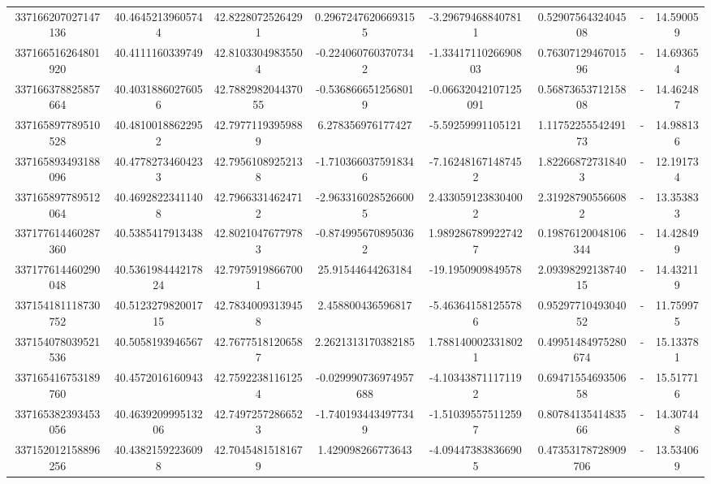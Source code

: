 \documentclass{article}
\begin{document}
\begin{landscape}
\begin{longtable}[c]{S[table-format=18.0]S[table-format=2.15]S[table-format=2.15]S[table-format=-2.17]S[table-format=-2.16]S[table-format=-2.16]S[table-format=-3.16]S[table-format=2.7]}
337166207027147136 & 40.46452139605744  & 42.82280725264291  & 0.29672476206693155   & -3.296794688407811   & 0.5290756432404508   & {-}                  & 14.590059  \\
337166516264801920 & 40.4111160339749   & 42.81033049835504  & -0.2240607603707342   & -1.3341711026690803  & 0.7630712946701596   & {-}                  & 14.693654  \\
337166378825857664 & 40.40318860276056  & 42.788298204437055 & -0.5368666512568019   & -0.06632042107125091 & 0.5687365371215808   & {-}                  & 14.462487  \\
337165897789510528 & 40.48100188622952  & 42.79771193959889  & 6.278356976177427     & -5.59259991105121    & 1.1175225554249173   & {-}                  & 14.988136  \\
337165893493188096 & 40.47782734604233  & 42.79561089252138  & -1.7103660375918346   & -7.162481671487452   & 1.822668727318403    & {-}                  & 12.191734  \\
337165897789512064 & 40.46928223411408  & 42.79663314624712  & -2.9633160285266005   & 2.4330591238304002   & 2.319287905566082    & {-}                  & 13.353833  \\
337177614460287360 & 40.5385417913438   & 42.80210476779783  & -0.8749956708950362   & 1.9892867899227427   & 0.19876120048106344  & {-}                  & 14.428499  \\
337177614460290048 & 40.536198444217824 & 42.79759198667001  & 25.91544644263184     & -19.1950909849578    & 2.0939829213874015   & {-}                  & 14.432119  \\
337154181118730752 & 40.512327982001715 & 42.78340093139458  & 2.458800436596817     & -5.463641581255786   & 0.9529771049304052   & {-}                  & 11.759975  \\
337154078039521536 & 40.5058193946567   & 42.76775181206587  & 2.2621313170382185    & 1.7881400023318021   & 0.49951484975280674  & {-}                  & 15.133781  \\
337165416753189760 & 40.4572016160943   & 42.75922381161254  & -0.029990736974957688 & -4.103438711171192   & 0.6947155469350658   & {-}                  & 15.517716  \\
337165382393453056 & 40.463920999513206 & 42.74972572866523  & -1.7401934434977349   & -1.510395575112597   & 0.8078413541483566   & {-}                  & 14.307448  \\
337152012158896256 & 40.43821592236098  & 42.70454815181679  & 1.429098266773643     & -4.094473838366905   & 0.47353178728909706  & {-}                  & 13.534069  \\

\end{longtable}
\end{landscape}
\end{document}

